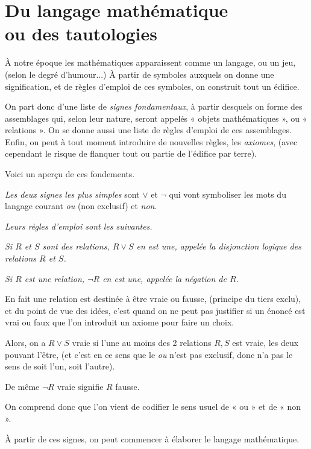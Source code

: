 \chapter{\texorpdfstring{Du langage mathématique\\ou des tautologies}{Du langage mathématique ou des tautologies}}

À notre époque les mathématiques apparaissent comme un langage, ou un jeu, (selon le degré d'humour...) À partir de symboles auxquels on donne une signification, et de règles d'emploi de ces symboles, on construit tout un édifice.

On part donc d'une liste de \emph{signes fondamentaux}, à partir desquels on forme des assemblages qui, selon leur nature, seront appelés « objets mathématiques », ou « relations ». On se donne aussi une liste de règles d'emploi de ces assemblages. Enfin, on peut à tout moment introduire de nouvelles règles, les \emph{axiomes}, (avec cependant le risque de flanquer tout ou partie de l'édifice par terre).

Voici un aperçu de ces fondements.

\emph{Les deux signes les plus simples} sont $\lor$ et $\neg$ qui vont symboliser les mots du langage courant \emph{ou} (non exclusif) et \emph{non}.

\emph{Leurs règles d'emploi sont les suivantes.}

\emph{Si $R$ et $S$ sont des relations, $R\lor S$ en est une, appelée la disjonction logique des relations $R$ et $S$.}

\emph{Si $R$ est une relation, $\neg R$ en est une, appelée la négation de $R$.}

En fait une relation est destinée à être vraie ou fausse, (principe du tiers exclu), et du point de vue des idées, c'est quand on ne peut pas justifier si un énoncé est vrai ou faux que l'on introduit un axiome pour faire un choix.

Alors, on a $R\lor S$ vraie si l'une au moins des 2 relations $R,S$ est vraie, les deux pouvant l'être, (et c'est en ce sens que le \emph{ou} n'est pas exclusif, donc n'a pas le sens de soit l'un, soit l'autre).

De même $\neg R$ vraie signifie $R$ fausse.

On comprend donc que l'on vient de codifier le sens usuel de « ou » et de « non ».

À partir de ces signes, on peut commencer à élaborer le langage mathématique.

